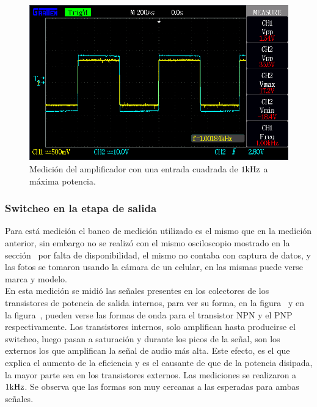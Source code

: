 \begin{figure}[H]
        \centering
        \includegraphics[width=0.95 \textwidth]{./img/mediciones/Power/2.png}
        \caption{Medición del amplificador con una entrada cuadrada de $1 \si[per-mode=symbol]{\kilo\hertz}$ a máxima potencia.}
        \label{fig:estab2}
\end{figure}

\vfill

\clearpage

\subsubsection{Switcheo en la etapa de salida}

Para está medición el banco de medición utilizado es el mismo que en la medición anterior, sin embargo no se realizó con el mismo osciloscopio mostrado en la sección~ por falta de disponibilidad, el mismo no contaba con captura de datos, y las fotos se tomaron usando la cámara de un celular, en las mismas puede verse marca y modelo.\\

En esta medición se midió las señales presentes en los colectores de los transistores de potencia de salida internos, para ver su forma, en la figura~ y en la figura~, pueden verse las formas de onda para el transistor NPN y el PNP respectivamente. Los transistores internos, solo amplifican hasta producirse el switcheo, luego pasan a saturación y durante los picos de la señal, son los externos los que amplifican la señal de audio más alta. Este efecto, es el que explica el aumento de la eficiencia y es el causante de que de la potencia disipada, la mayor parte sea en los transistores externos.
Las mediciones se realizaron a $1 \si[per-mode=symbol]{\kilo\hertz}$. Se observa que las formas son muy cercanas a las esperadas para ambas señales.\\


